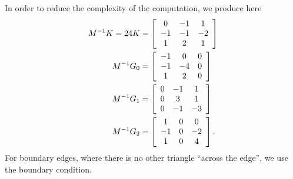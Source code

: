 \documentclass[letterpaper,10pt]{article}
\begin{document}
In order to reduce the complexity of the computation, we produce here
\begin{align*}
M^{-1} K = 24K &= \left[ \begin{array}{c c c}
 0 & -1 &  1 \\
-1 & -1 & -2 \\
 1 &  2 &  1 \end{array}\right] \\
M^{-1} G_0 &= \left[ \begin{array}{c c c}
-1 &  0 & 0 \\
-1 & -4 & 0 \\
 1 &  2 & 0 \end{array}\right] \\
M^{-1} G_1 &= \left[ \begin{array}{c c c}
0 & -1 &  1 \\
0 &  3 &  1 \\
0 & -1 & -3 \end{array}\right] \\
M^{-1} G_2 &= \left[ \begin{array}{c c c}
 1 & 0 &  0 \\
-1 & 0 & -2 \\
 1 & 0 &  4 \end{array}\right].
\end{align*}
For boundary edges, where there is no other triangle ``across the edge'',
we use the boundary condition.
\end{document}
